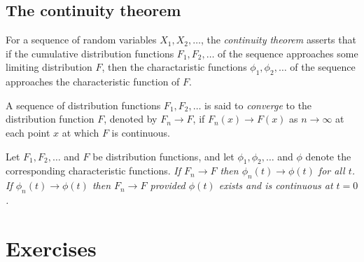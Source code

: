 
\subsection{The continuity theorem} 
For a sequence of random variables $X_1,X_2,\ldots$, the \emph{continuity theorem} asserts that if the cumulative distribution functions $F_1,F_2,\ldots$ of the sequence approaches some limiting distribution $F$, then the charactaristic functions $\phi_1,\phi_2,\ldots$ of the sequence approaches the characteristic function of $F$.

\begin{definition}
A sequence of distribution functions $F_1,F_2,\ldots$ is said to \emph{converge} to the distribution function $F$, denoted by $F_n\to F$, if $F_n(x)\to F(x)$ as $n\to\infty$ at each point $x$ at which $F$ is continuous.
\end{definition}

\begin{theorem}
Let $F_1,F_2,\ldots$ and $F$ be distribution functions, and let $\phi_1,\phi_2,\ldots$ and $\phi$ denote the corresponding characteristic functions. 
\ben
\it If $F_n\to F$ then $\phi_n(t)\to\phi(t)$ for all $t$.
\it If $\phi_n(t)\to\phi(t)$ then $F_n\to F$ provided $\phi(t)$ exists and is continuous at $t=0$.
\een
\end{theorem}
\proofomitted


\section{Exercises}


\endinput
